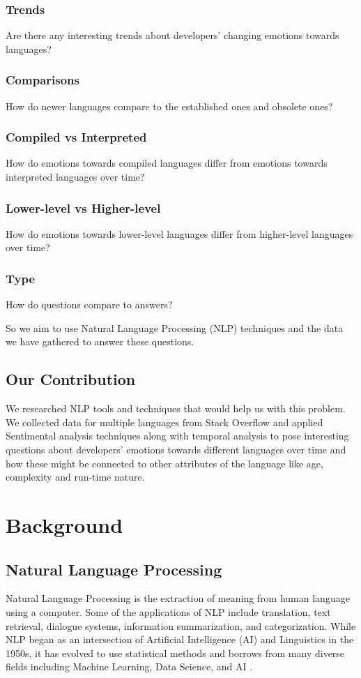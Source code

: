 \documentclass[conference]{IEEEtran}
\begin{document}
 \subsubsection{Trends}Are there any interesting trends about developers' changing emotions towards languages?
 \subsubsection{Comparisons}How do newer languages compare to the established ones and obsolete ones?
 \subsubsection{Compiled vs Interpreted}How do emotions towards compiled languages differ from emotions towards interpreted languages over time?
 \subsubsection{Lower-level vs Higher-level} How do emotions towards lower-level languages differ from higher-level languages over time?
 \subsubsection{Type}How do questions compare to answers?
 

So we aim to use Natural Language Processing (NLP) techniques and the data we have gathered to answer these questions.

\subsection{Our Contribution}
We researched NLP tools and techniques that would help us with this problem. We collected data for multiple languages from Stack Overflow and applied Sentimental analysis techniques along with temporal analysis to pose interesting questions about developers' emotions towards different languages over time and how these might be connected to other attributes of the language like age, complexity and run-time nature.\\

\section{Background}

\subsection{Natural Language Processing}
Natural Language Processing is the extraction of meaning from human language using a computer\cite{b7, b8}. Some of the applications of NLP include translation, text retrieval, dialogue systems, information summarization, and categorization\cite{b7}. While NLP began as an intersection of Artificial Intelligence (AI) and Linguistics in the 1950s, it has evolved to use statistical methods and borrows from many diverse fields including Machine Learning, Data Science, and AI \cite{b8}. \\
\end{document}
